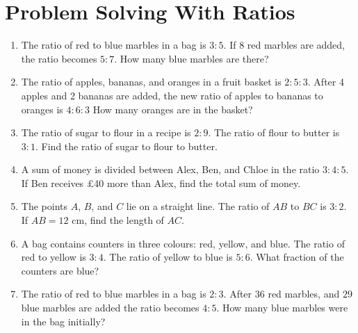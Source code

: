 \documentclass[12pt,a4paper]{article}
\begin{document}
\section*{Problem Solving With Ratios}
\begin{enumerate}

    \item The ratio of red to blue marbles in a bag is $3:5$. If 8 red marbles are added, the ratio becomes $5:7$. How many blue marbles are there?

    \item The ratio of apples, bananas, and oranges in a fruit basket is $2:5:3$. After 4 apples and 2 bananas are added, the new ratio of apples to bananas to oranges is $4:6:3$ How many oranges are in the basket?

    \item The ratio of sugar to flour in a recipe is $2:9$. The ratio of flour to butter is $3:1$. Find the ratio of sugar to flour to butter.

    \item A sum of money is divided between Alex, Ben, and Chloe in the ratio $3:4:5$. If Ben receives £40 more than Alex, find the total sum of money.

    \item The points $A$, $B$, and $C$ lie on a straight line. The ratio of $AB$ to $BC$ is $3:2$. If $AB = 12$ cm, find the length of $AC$.

    \item A bag contains counters in three colours: red, yellow, and blue. The ratio of red to yellow is $3:4$. The ratio of yellow to blue is $5:6$. What fraction of the counters are blue?

    \item The ratio of red to blue marbles in a bag is $2:3$. After $36$ red marbles, and $29$ blue marbles are added the ratio becomes $4:5$. How many blue marbles were in the bag initially?

\end{enumerate}
\end{document}

